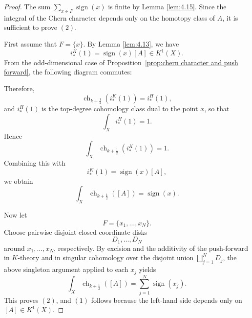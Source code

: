 \documentclass{amsart}
\theoremstyle{definition}
\theoremstyle{remark}
\begin{document}
\begin{proof}
The sum $\sum_{x \in F}\operatorname{sign}(x)$ is finite by Lemma \ref{lem:4.15}.
Since the integral of the Chern character depends only on the homotopy class of $A$,
it is sufficient to prove $(2)$.

First assume that $F=\{x\}$.
By Lemma \ref{lem:4.13}, we have
\[
i_{*}^{K}(1)=\operatorname{sign}(x)[A] \in K^{1}(X).
\]
From the odd-dimensional case of Proposition~\ref{prop:chern character and push forward},
the following diagram commutes:
\begin{center}
\end{center}
Therefore,
\[
\operatorname{ch}_{k+\frac{1}{2}}(i_*^K(1))=i_*^H(1),
\]
and $i_*^H(1)$ is the top-degree cohomology class dual to the point $x$, so that
\[
\int_X i_*^H(1)=1.
\]
Hence
\[
\int_X \operatorname{ch}_{k+\frac{1}{2}}(i_*^K(1))=1.
\]
Combining this with
\[
i_*^K(1)=\operatorname{sign}(x)[A],
\]
we obtain
\[
\int_X \operatorname{ch}_{k+\frac{1}{2}}([A])=\operatorname{sign}(x).
\]

Now let
\[
F=\{x_1,\dots,x_N\}.
\]
Choose pairwise disjoint closed coordinate disks
\[
D_1,\dots,D_N
\]
around $x_1,\dots,x_N$, respectively.
By excision and the additivity of the push-forward in $K$-theory and in singular cohomology
over the disjoint union $\bigsqcup_{j=1}^{N}D_j$, the above singleton argument applied to
each $x_j$ yields
\[
\int_X \operatorname{ch}_{k+\frac{1}{2}}([A])
=
\sum_{j=1}^{N}\operatorname{sign}(x_j).
\]
This proves $(2)$, and $(1)$ follows because the left-hand side depends only on
$[A]\in K^1(X)$.
\end{proof}
\end{document}
